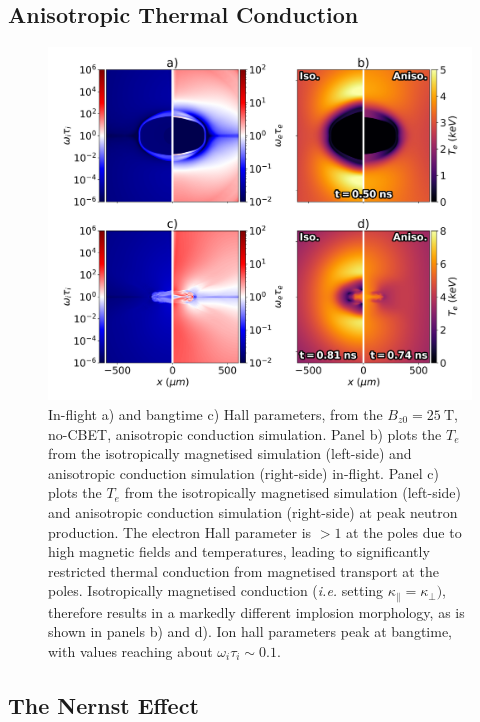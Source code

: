 \subsection{Anisotropic Thermal Conduction}%
\label{sec:Res2_aniso}


\begin{figure}[t!]
    \includegraphics[width=0.8\linewidth]{Results2/Images/iso_aniso.png}
    \centering
    \caption{In-flight a) and bangtime c) Hall parameters, from the $B_{z0}=25\ \text{T}$, no-\ac{CBET}, anisotropic conduction simulation.
    Panel b) plots the $T_e$ from the isotropically magnetised simulation (left-side) and anisotropic conduction simulation (right-side) in-flight.
    Panel c) plots the $T_e$ from the isotropically magnetised simulation (left-side) and anisotropic conduction simulation (right-side) at peak neutron production.
    The electron Hall parameter is $>1$ at the poles due to high magnetic fields and temperatures, leading to significantly restricted thermal conduction from magnetised transport at the poles.
    Isotropically magnetised conduction (\textit{i.e.} setting $\kappa_{\parallel}=\kappa_{\perp})$, therefore results in a markedly different implosion morphology, as is shown in panels b) and d).
    Ion hall parameters peak at bangtime, with values reaching about $\omega_i\tau_i\sim0.1$.}%
    \label{fig:Res2_iso_aniso}
\end{figure}

\subsection{The Nernst Effect}%
\label{sec:Res2_nernst}


